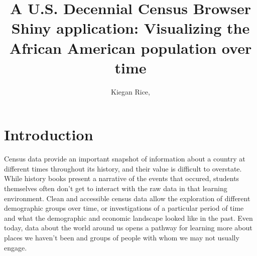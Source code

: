 \documentclass[DIV=calc, paper=a4, fontsize=10pt, twocolumn]{scrartcl}\usepackage[]{graphicx}\usepackage[]{color}
\title{A U.S. Decennial Census Browser Shiny application: Visualizing the African American population over time} %
\author{Kiegan Rice, } %
\date{} %
\newcommand{\initial}[1]{ %
\lettrine[lines=3,lhang=0.3,nindent=0em]{
\color{black}
{\textsf{#1}}}{}}
\newcommand{\st}[1]{{\color{purple} #1}}
\begin{document}


\maketitle %

\thispagestyle{fancy} %


\vspace{-1cm}

\section*{Introduction}

\initial{C}ensus data provide an important snapshot of information about a country at different times throughout its history, and their value is difficult to overstate.  While history books present a narrative of the events that occured, students themselves often don't get to interact with the raw data in that learning environment. Clean and accessible census data allow the exploration of different demographic groups over time, or investigations of a particular period of time and what the demographic and economic landscape looked like in the past. Even today, data about the world around us opens a pathway for learning more about places we haven't been and groups of people with whom we may not usually engage.  
\end{document}
